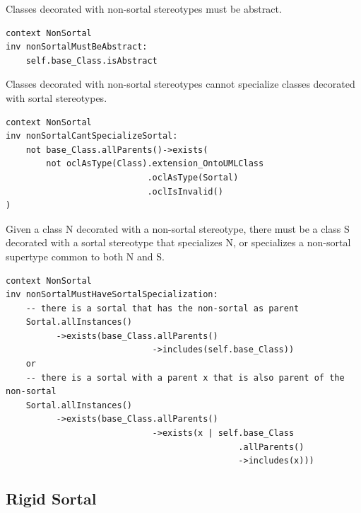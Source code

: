 \begin{constraint}
\label{nonSortalMustBeAbstract}
Classes decorated with non-sortal stereotypes must be abstract.

\begin{lstlisting}[language=OCL]
context NonSortal 
inv nonSortalMustBeAbstract:
    self.base_Class.isAbstract
\end{lstlisting}
\end{constraint}

\begin{constraint}
\label{nonSortalCantSpecializeSortal}
Classes decorated with non-sortal stereotypes cannot specialize classes decorated with sortal stereotypes.

\begin{lstlisting}[language=OCL]
context NonSortal 
inv nonSortalCantSpecializeSortal:
    not base_Class.allParents()->exists(
        not oclAsType(Class).extension_OntoUMLClass
                            .oclAsType(Sortal)
                            .oclIsInvalid()
)
\end{lstlisting}
\end{constraint}

\begin{constraint}
\label{nonSortalMustHaveSortalSpecialization}
Given a class N decorated with a non-sortal stereotype, there must be a class S decorated with a sortal stereotype that specializes N, or specializes a non-sortal supertype common to both N and S.

\begin{lstlisting}[language=OCL]
context NonSortal 
inv nonSortalMustHaveSortalSpecialization:
    -- there is a sortal that has the non-sortal as parent
    Sortal.allInstances()
          ->exists(base_Class.allParents()
                             ->includes(self.base_Class))
    or
    -- there is a sortal with a parent x that is also parent of the non-sortal
    Sortal.allInstances()
          ->exists(base_Class.allParents()
                             ->exists(x | self.base_Class
                                              .allParents()
                                              ->includes(x)))
\end{lstlisting}
\end{constraint}

\subsection{Rigid Sortal}
\label{stereotype:rigidSortal}

